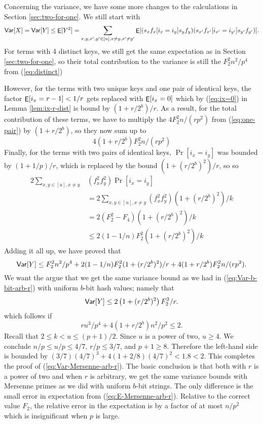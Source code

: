 \documentclass[12pt]{article}
\DeclareMathOperator*{\E}{\sf{E}}
\newcommand{\Var}{{\sf Var}}
\newcommand{\req}[1]{(\ref{#1})}
\begin{document}
Concerning the variance, we have some more changes to the 
calculations in Section \ref{sec:two-for-one}.
We still start with
\[\Var[X]=\Var[Y]\leq \E[Y^2]=
\sum_{x,y,x',y'\in[u],x\neq y,x'\neq y'}\E[(s_x f_x[i_x=i_y]s_y f_y)
  (s_{x'}f_{x'}[i_{x'}=i_{y'}]s_{y'} f_{y'})].\] 
For terms with 4 distinct keys, we still get the same expectation
as in Section \ref{sec:two-for-one}, so their
total contribution to the variance is still the $F_2^2 n^2/p^4$ from
\req{eq:distinct}

However, for the terms with two unique keys and one pair of identical
keys, the factor $\E[i_x=r-1]<1/r$ gets replaced with $\E[i_x=0]$
which by \req{eq:ix=0} in Lemma \ref{lem:ix-r-dist} is bound by
$(1+r/2^b)/r$. As a result, for the total contribution of these terms,
we have to multiply the $4 F_2^2 n/(rp^2)$ from \req{eq:one-pair} by
$(1+r/2^b)$, so they now sum up to
\begin{equation}\label{eq:one-pair'}
4 (1+r/2^b) F_2^2 n/(rp^2)
\end{equation}
Finally, for the terms with two pairs of identical keys, $\Pr[i_x=i_y]$ was bounded
by $(1+1/p)/r$, which is replaced by the bound $\left(1+(r/2^b)^2\right)/r$, so
so 
\begin{align}
2\sum_{x,y\in[u],x\neq y}&(f_x^2f_y^2)\Pr[i_x=i_y]\nonumber\\
&=2\sum_{x,y\in[u],x\neq y}(f_x^2f_y^2)(1+(r/2^b)^2)/k\nonumber\\
&=2(F_2^2-F_4)(1+(r/2^b)^2)/k\nonumber\\
&\leq 2(1-1/n)F_2^2(1+(r/2^b)^2)/k\label{eq:two-pairs'}
\end{align}
Adding it all up, we have proved that 
\[\Var[Y]\leq F_2^2 n^2/p^4+2(1-1/n)F_2^2(1+(r/2^b)^2)/r+4(1+r/2^b)F_2^2 n/(rp^2).\]
We want the argue that we get the same variance bound as we had in 
\req{eq:Var-b-bit-arb-r} with uniform $b$-bit hash values; namely that
\begin{equation}\label{eq:Var-Mersenne-arb-r}
\Var[Y]\leq 2\left(1+(r/2^b)^2\right)F_2^2/r.
\end{equation}
which follows if 
\[ru^3/p^4+4(1+r/2^b)n^2/p^2\leq 2.\]
Recall that $2\leq k<u\leq (p+1)/2$. Since $u$ is a power of two,
$u\geq 4$. We conclude $n/p\leq u/p\leq 4/7$, $r/p\leq 3/7$, and
$p+1\geq 8$. Therefore the left-hand side is bounded by
$(3/7)(4/7)^3+4(1+2/8)(4/7)^2<1.8<2$.  This completes the proof of
\req{eq:Var-Mersenne-arb-r}. The basic conclusion is that both with
$r$ is a power of two and when $r$ is arbitrary, we get the same
variance bounds with Mersenne primes as we did with uniform $b$-bit
strings. The only difference is the small error in expectation from
\req{eq:E-Mersenne-arb-r}. Relative to the correct value $F_2$, the
relative error in the expectation is by a factor of at most
$n/p^2$ which is insignificant when $p$ is large.





\end{document}
